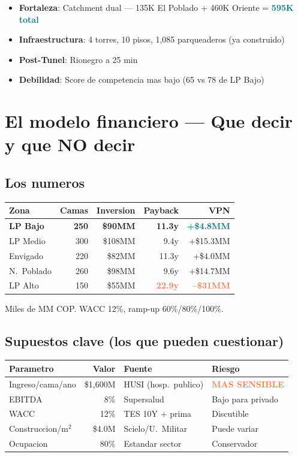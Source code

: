 \documentclass[11pt, a4paper]{article}
\newcommand{\hl}[1]{\textcolor{teal}{\textbf{#1}}}
\newcommand{\dg}[1]{\textcolor{coral}{\textbf{#1}}}
\begin{document}
\begin{itemize}[nosep]
  \item \textbf{Fortaleza}: Catchment dual --- 135K El Poblado + 460K Oriente = \hl{595K total}
  \item \textbf{Infraestructura}: 4 torres, 10 pisos, 1,085 parqueaderos (ya construido)
  \item \textbf{Post-Tunel}: Rionegro a 25 min
  \item \textbf{Debilidad}: Score de competencia mas bajo (65 vs 78 de LP Bajo)
\end{itemize}


\section{El modelo financiero --- Que decir y que NO decir}

\subsection{Los numeros}

\begin{tabular}{@{}lrrrr@{}}
\toprule
\textbf{Zona} & \textbf{Camas} & \textbf{Inversion} & \textbf{Payback} & \textbf{VPN} \\
\midrule
\rowcolor{bgtip}
\textbf{LP Bajo} & \textbf{250} & \textbf{\$90MM} & \textbf{11.3y} & \hl{+\$4.8MM} \\
LP Medio & 300 & \$108MM & 9.4y & +\$15.3MM \\
Envigado & 220 & \$82MM & 11.3y & +\$4.0MM \\
N.\ Poblado & 260 & \$98MM & 9.6y & +\$14.7MM \\
\rowcolor{bgcrit}
LP Alto & 150 & \$55MM & \dg{22.9y} & \dg{--\$31MM} \\
\bottomrule
\end{tabular}

{\small Miles de MM COP. WACC 12\%, ramp-up 60\%/80\%/100\%.}

\subsection{Supuestos clave (los que pueden cuestionar)}

{\small
\begin{tabular}{@{}lrll@{}}
\toprule
\textbf{Parametro} & \textbf{Valor} & \textbf{Fuente} & \textbf{Riesgo} \\
\midrule
\rowcolor{bgwarn}
Ingreso/cama/ano & \$1,600M & HUSI (hosp.\ publico) & \dg{MAS SENSIBLE} \\
EBITDA & 8\% & Supersalud & Bajo para privado \\
\rowcolor{bgwarn}
WACC & 12\% & TES 10Y + prima & Discutible \\
Construccion/m$^2$ & \$4.0M & Scielo/U.\ Militar & Puede variar \\
Ocupacion & 80\% & Estandar sector & Conservador \\
\bottomrule
\end{tabular}
}
\end{document}
